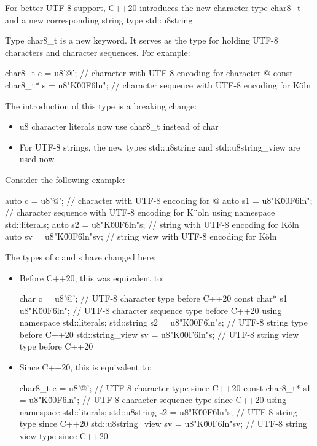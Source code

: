 
For better UTF-8 support, C++20 introduces the new character type char8\_t and a new corresponding string type std::u8string.

Type char8\_t is a new keyword. It serves as the type for holding UTF-8 characters and character sequences. For example:

\begin{cpp}
char8_t c = u8'@'; // character with UTF-8 encoding for character @
const char8_t* s = u8"K\u00F6ln"; // character sequence with UTF-8 encoding for Köln
\end{cpp}

The introduction of this type is a breaking change:

\begin{itemize}
\item 
u8 character literals now use char8\_t instead of char

\item 
For UTF-8 strings, the new types std::u8string and std::u8string\_view are used now
\end{itemize}

Consider the following example:

\begin{cpp}
auto c = u8'@'; // character with UTF-8 encoding for @
auto s1 = u8"K\u00F6ln"; // character sequence with UTF-8 encoding for K¨oln
using namespace std::literals;
auto s2 = u8"K\u00F6ln"s; // string with UTF-8 encoding for Köln
auto sv = u8"K\u00F6ln"sv; // string view with UTF-8 encoding for Köln
\end{cpp}

The types of c and s have changed here:

\begin{itemize}
\item 
Before C++20, this was equivalent to:

\begin{cpp}
char c = u8'@'; // UTF-8 character type before C++20
const char* s1 = u8"K\u00F6ln"; // UTF-8 character sequence type before C++20
using namespace std::literals;
std::string s2 = u8"K\u00F6ln"s; // UTF-8 string type before C++20
std::string_view sv = u8"K\u00F6ln"s; // UTF-8 string view type before C++20
\end{cpp}

\item 
Since C++20, this is equivalent to:

\begin{cpp}
char8_t c = u8'@'; // UTF-8 character type since C++20
const char8_t* s1 = u8"K\u00F6ln"; // UTF-8 character sequence type since C++20
using namespace std::literals;
std::u8string s2 = u8"K\u00F6ln"s; // UTF-8 string type since C++20
std::u8string_view sv = u8"K\u00F6ln"sv; // UTF-8 string view type since C++20
\end{cpp}

\end{itemize}

